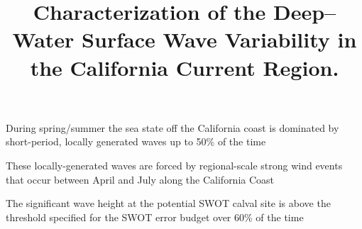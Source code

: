 


%
%

\title{Characterization of the Deep--Water Surface Wave Variability in the California Current Region.}

%
%







\begin{keypoints}
\item During spring/summer the sea state off the California coast is dominated by short-period, locally generated waves up to 50\% of the time   
\item These locally-generated waves are forced by regional-scale strong wind events that occur between April and July along the California Coast
\item The significant wave height at the potential SWOT calval site is above the threshold specified for the SWOT error budget over 60\% of the time
\end{keypoints}

